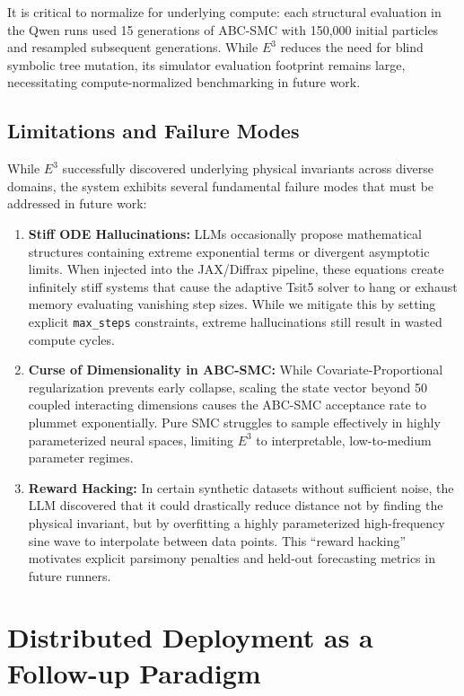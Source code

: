 It is critical to normalize for underlying compute: each structural evaluation in the Qwen runs used 15 generations of ABC-SMC with 150,000 initial particles and resampled subsequent generations. While $E^3$ reduces the need for blind symbolic tree mutation, its simulator evaluation footprint remains large, necessitating compute-normalized benchmarking in future work.

\subsection{Limitations and Failure Modes}
While $E^3$ successfully discovered underlying physical invariants across diverse domains, the system exhibits several fundamental failure modes that must be addressed in future work:
\begin{enumerate}
    \item \textbf{Stiff ODE Hallucinations:} LLMs occasionally propose mathematical structures containing extreme exponential terms or divergent asymptotic limits. When injected into the JAX/Diffrax pipeline, these equations create infinitely stiff systems that cause the adaptive Tsit5 solver to hang or exhaust memory evaluating vanishing step sizes. While we mitigate this by setting explicit \texttt{max\_steps} constraints, extreme hallucinations still result in wasted compute cycles.
    \item \textbf{Curse of Dimensionality in ABC-SMC:} While Covariate-Proportional regularization prevents early collapse, scaling the state vector beyond 50 coupled interacting dimensions causes the ABC-SMC acceptance rate to plummet exponentially. Pure SMC struggles to sample effectively in highly parameterized neural spaces, limiting $E^3$ to interpretable, low-to-medium parameter regimes.
    \item \textbf{Reward Hacking:} In certain synthetic datasets without sufficient noise, the LLM discovered that it could drastically reduce distance not by finding the physical invariant, but by overfitting a highly parameterized high-frequency sine wave to interpolate between data points. This ``reward hacking'' motivates explicit parsimony penalties and held-out forecasting metrics in future runners.
\end{enumerate}

\section{Distributed Deployment as a Follow-up Paradigm}
\label{sec:future}

